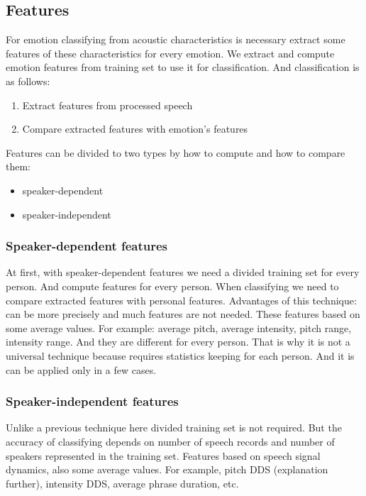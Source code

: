 \documentclass[12pt, letterpaper]{article}
\begin{document}
\subsection{Features}
For emotion classifying from acoustic characteristics is necessary extract some features of these characteristics for every emotion. We extract and compute emotion features from training set to use it for classification. And classification is as follows:
\begin{enumerate}
	\item Extract features from processed speech
	\item Compare extracted features with emotion's features
\end{enumerate}

Features can be divided to two types by how to compute and how to compare them:
\begin{itemize}
	\item speaker-dependent
	\item speaker-independent
\end{itemize}

\subsubsection{Speaker-dependent features}
At first, with speaker-dependent features we need a divided training set for every person. And compute features for every person. When classifying we need to compare extracted features with personal features. Advantages of this technique: can be more precisely and much features are not needed. These features based on some average values. For example: average pitch, average intensity, pitch range, intensity range. And they are different for every person. That is why it is not a universal technique because requires statistics keeping for each person. And it is can be applied only in a few cases.
\subsubsection{Speaker-independent features}
Unlike a previous technique here divided training set is not required. But the accuracy of classifying depends on number of speech records and number of speakers represented in the training set. Features based on speech signal dynamics, also some average values. For example, pitch DDS (explanation further), intensity DDS, average phrase duration, etc.
\end{document}
